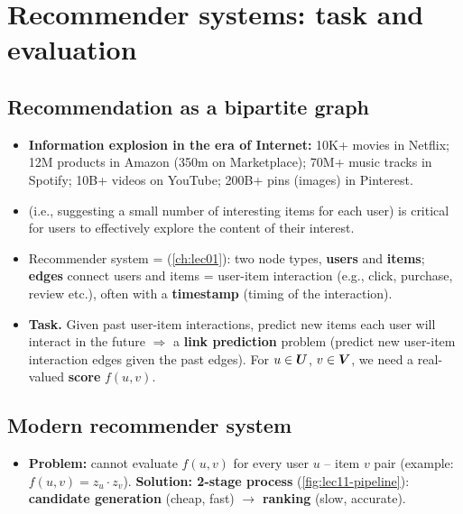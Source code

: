 \section{Recommender systems: task and evaluation}\label{sec:lec11-task}

\subsection{Recommendation as a bipartite graph}\label{sec:lec11-bipartite}

\begin{itemize}
  \item \textbf{Information explosion in the era of Internet:} 10K+ movies in
    Netflix; 12M products in Amazon (350m on Marketplace); 70M+ music tracks in
    Spotify; 10B+ videos on YouTube; 200B+ pins (images) in Pinterest.
  \item {} (i.e., suggesting a small number of
    interesting items for each user) is critical for users to effectively
    explore the content of their interest.
  \item Recommender system =  (\cref{ch:lec01}): two node
    types, \textbf{users} and \textbf{items}; \textbf{edges} connect users and
    items = user-item interaction (e.g., click, purchase, review etc.), often
    with a \textbf{timestamp} (timing of the interaction).
  \item \textbf{Task.} Given past user-item interactions, predict new items
    each user will interact in the future $\Rightarrow$ a \textbf{link
    prediction} problem (predict new user-item interaction edges given the past
    edges). For $u\in\bm{U}$, $v\in\bm{V}$, we need a real-valued \textbf{score}
    $f(u,v)$.
\end{itemize}

\subsection{Modern recommender system}\label{sec:lec11-modern}

\begin{itemize}
  \item \textbf{Problem:} cannot evaluate $f(u,v)$ for every user $u$ -- item
    $v$ pair (example: $f(u,v)=z_u\cdot z_v$). \textbf{Solution: 2-stage
    process} (\cref{fig:lec11-pipeline}): \textbf{candidate generation} (cheap,
    fast) $\to$ \textbf{ranking} (slow, accurate).
\end{itemize}

